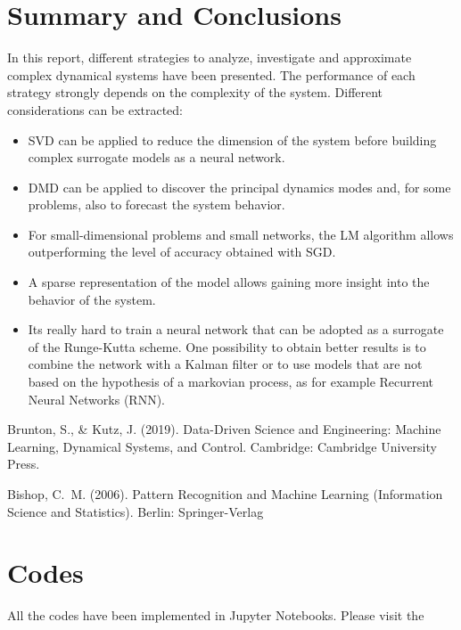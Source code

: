 \documentclass[]{article}
\begin{document}
\section{Summary and Conclusions}
In this report, different strategies to analyze, investigate and approximate complex dynamical systems have been presented. The performance of each strategy strongly depends on the complexity of the system. Different considerations can be extracted:
\begin{itemize}
	\item SVD can be applied to reduce the dimension of the system before building complex surrogate models as a neural network.
	\item DMD can be applied to discover the principal dynamics modes and, for some problems, also to forecast the system behavior.
	\item For small-dimensional problems and small networks, the LM  algorithm allows outperforming the level of accuracy obtained with SGD.
	\item A sparse representation of the model allows gaining more insight into the behavior of the system.
	\item Its really hard to train a neural network that can be adopted as a surrogate of the Runge-Kutta scheme. One possibility to obtain better results is to combine the network with a Kalman filter or to use models that are not based on the hypothesis of a markovian process, as for example Recurrent Neural Networks (RNN).
\end{itemize}

\begin{thebibliography}{99} %
	
	Brunton, S., \& Kutz, J. (2019). Data-Driven Science and Engineering: Machine Learning, Dynamical Systems, and Control. Cambridge: Cambridge University Press.
	
	Bishop, C.~M. (2006). Pattern Recognition and Machine Learning (Information Science and Statistics). Berlin: Springer-Verlag
	
	
\end{thebibliography}

\appendix
\section{Codes}
All the codes have been implemented in Jupyter Notebooks. Please visit the 
\end{document}
